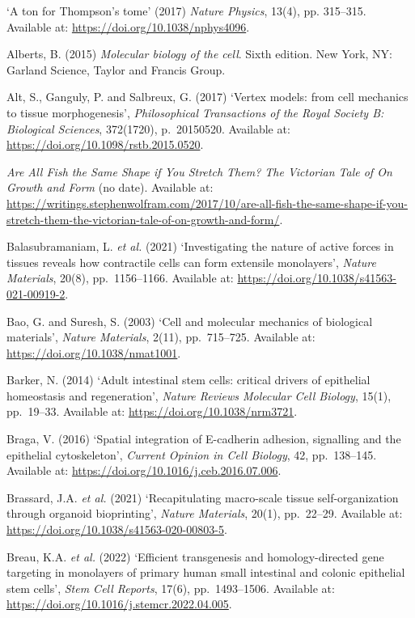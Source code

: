 \documentclass[
]{article}
\begin{document}
`A ton for Thompson's tome' (2017) \emph{Nature Physics}, 13(4), pp.
315--315. Available at: \url{https://doi.org/10.1038/nphys4096}.

Alberts, B. (2015) \emph{Molecular biology of the cell}. Sixth edition.
New York, NY: Garland Science, Taylor and Francis Group.

Alt, S., Ganguly, P. and Salbreux, G. (2017) `Vertex models: from cell
mechanics to tissue morphogenesis', \emph{Philosophical Transactions of
the Royal Society B: Biological Sciences}, 372(1720), p.~20150520.
Available at: \url{https://doi.org/10.1098/rstb.2015.0520}.

\emph{Are All Fish the Same Shape if You Stretch Them? The Victorian
Tale of On Growth and Form} (no date). Available at:
\url{https://writings.stephenwolfram.com/2017/10/are-all-fish-the-same-shape-if-you-stretch-them-the-victorian-tale-of-on-growth-and-form/}.

Balasubramaniam, L. \emph{et al.} (2021) `Investigating the nature of
active forces in tissues reveals how contractile cells can form
extensile monolayers', \emph{Nature Materials}, 20(8), pp.~1156--1166.
Available at: \url{https://doi.org/10.1038/s41563-021-00919-2}.

Bao, G. and Suresh, S. (2003) `Cell and molecular mechanics of
biological materials', \emph{Nature Materials}, 2(11), pp.~715--725.
Available at: \url{https://doi.org/10.1038/nmat1001}.

Barker, N. (2014) `Adult intestinal stem cells: critical drivers of
epithelial homeostasis and regeneration', \emph{Nature Reviews Molecular
Cell Biology}, 15(1), pp.~19--33. Available at:
\url{https://doi.org/10.1038/nrm3721}.

Braga, V. (2016) `Spatial integration of E-cadherin adhesion, signalling
and the epithelial cytoskeleton', \emph{Current Opinion in Cell
Biology}, 42, pp.~138--145. Available at:
\url{https://doi.org/10.1016/j.ceb.2016.07.006}.

Brassard, J.A. \emph{et al.} (2021) `Recapitulating macro-scale tissue
self-organization through organoid bioprinting', \emph{Nature
Materials}, 20(1), pp.~22--29. Available at:
\url{https://doi.org/10.1038/s41563-020-00803-5}.

Breau, K.A. \emph{et al.} (2022) `Efficient transgenesis and
homology-directed gene targeting in monolayers of primary human small
intestinal and colonic epithelial stem cells', \emph{Stem Cell Reports},
17(6), pp.~1493--1506. Available at:
\url{https://doi.org/10.1016/j.stemcr.2022.04.005}.
\end{document}
